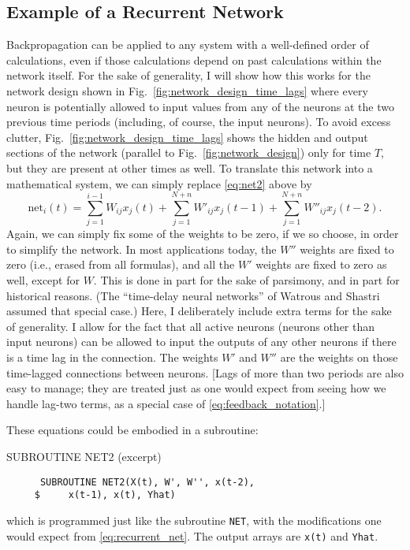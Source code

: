 \documentclass[journal]{IEEEtran} %
\begin{document}
\subsection{Example of a Recurrent Network}
Backpropagation can be applied to any system with a well-defined order of calculations, even if those calculations depend on past calculations within the network itself. For the sake of generality, I will show how this works for the network design shown in Fig.~\ref{fig:network_design_time_lags} where every neuron is potentially allowed to input values from any of the neurons at the two previous time periods (including, of course, the input neurons). To avoid excess clutter, Fig.~\ref{fig:network_design_time_lags} shows the hidden and output sections of the network (parallel to Fig.~\ref{fig:network_design}) only for time $T$, but they are present at other times as well. To translate this network into a mathematical system, we can simply replace \eqref{eq:net2} above by
\begin{equation}
    \text{net}_i(t) = \sum_{j=1}^{i-1} W_{ij}x_j(t) + \sum_{j=1}^{N+n} W'_{ij}x_j(t-1) + \sum_{j=1}^{N+n} W''_{ij}x_j(t-2). \label{eq:recurrent_net}
\end{equation}
Again, we can simply fix some of the weights to be zero, if we so choose, in order to simplify the network. In most applications today, the $W''$ weights are fixed to zero (i.e., erased from all formulas), and all the $W'$ weights are fixed to zero as well, except for $W$. This is done in part for the sake of parsimony, and in part for historical reasons. (The ``time-delay neural networks'' of Watrous and Shastri \cite{Watrous:1987} assumed that special case.) Here, I deliberately include extra terms for the sake of generality. I allow for the fact that all active neurons (neurons other than input neurons) can be allowed to input the outputs of any other neurons if there is a time lag in the connection. The weights $W'$ and $W''$ are the weights on those time-lagged connections between neurons. [Lags of more than two periods are also easy to manage; they are treated just as one would expect from seeing how we handle lag-two terms, as a special case of \eqref{eq:feedback_notation}.]

These equations could be embodied in a subroutine:
\begin{fortrancode}
\caption{SUBROUTINE NET2 (excerpt)}
\begin{verbatim}
      SUBROUTINE NET2(X(t), W', W'', x(t-2),
     $     x(t-1), x(t), Yhat)
\end{verbatim}
\end{fortrancode}
which is programmed just like the subroutine \texttt{NET}, with the modifications one would expect from \eqref{eq:recurrent_net}. The output arrays are \texttt{x(t)} and \texttt{Yhat}.
\end{document}
